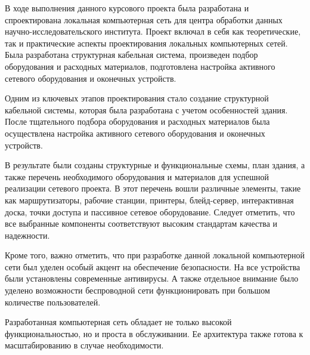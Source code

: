 \label{sec:outro}

В ходе выполнения данного курсового проекта была разработана и спроектирована локальная компьютерная сеть для центра обработки данных научно-исследовательского института. Проект включал в себя как теоретические, так и практические аспекты проектирования локальных компьютерных сетей. Была разработана структурная кабельная система, произведен подбор оборудования и расходных материалов, подготовлена настройка активного сетевого оборудования и оконечных устройств.  

Одним из ключевых этапов проектирования стало создание структурной кабельной системы, которая была разработана с учетом особенностей здания. После тщательного подбора оборудования и расходных материалов была осуществлена настройка активного сетевого оборудования и оконечных устройств.

В результате были созданы структурные и функциональные схемы, план здания, а также перечень необходимого оборудования и материалов для успешной реализации сетевого проекта. В этот перечень вошли различные элементы, такие как маршрутизаторы, рабочие станции, принтеры, блейд-сервер, интерактивная доска, точки доступа и пассивное сетевое оборудование. Следует отметить, что все выбранные компоненты соответствуют высоким стандартам качества и надежности.

Кроме того, важно отметить, что при разработке данной локальной компьютерной сети был уделен особый акцент на обеспечение безопасности. На все устройства были установлены современные антивирусы. А также отдельное внимание было уделено возможности беспроводной сети функционировать при большом количестве пользователей.

Разработанная компьютерная сеть обладает не только высокой функциональностью, но и проста в обслуживании. Ее архитектура также готова к масштабированию в случае необходимости.
